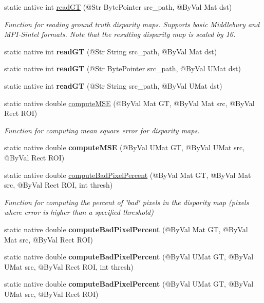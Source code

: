 \begin{DoxyCompactItemize}
static native int \hyperlink{group__ximgproc__filters_ga98c3c9fc13d0d1e808c73c8a0ae91a09}{read\+GT} (@Str Byte\+Pointer src\+\_\+path, @By\+Val Mat dst)
\begin{DoxyCompactList}\small\item\em Function for reading ground truth disparity maps. Supports basic Middlebury and M\+P\+I-\/\+Sintel formats. Note that the resulting disparity map is scaled by 16. \end{DoxyCompactList}\item 
static native int {\bfseries read\+GT} (@Str String src\+\_\+path, @By\+Val Mat dst)
\item 
static native int {\bfseries read\+GT} (@Str Byte\+Pointer src\+\_\+path, @By\+Val U\+Mat dst)
\item 
static native int {\bfseries read\+GT} (@Str String src\+\_\+path, @By\+Val U\+Mat dst)
\item 
static native double \hyperlink{group__ximgproc__filters_ga0f224e6315d538e257cba2fb7ae0bbee}{compute\+M\+SE} (@By\+Val Mat GT, @By\+Val Mat src, @By\+Val Rect R\+OI)
\begin{DoxyCompactList}\small\item\em Function for computing mean square error for disparity maps. \end{DoxyCompactList}\item 
static native double {\bfseries compute\+M\+SE} (@By\+Val U\+Mat GT, @By\+Val U\+Mat src, @By\+Val Rect R\+OI)
\item 
static native double \hyperlink{group__ximgproc__filters_ga04b04ac57f6b8c53deacbb1d41d05766}{compute\+Bad\+Pixel\+Percent} (@By\+Val Mat GT, @By\+Val Mat src, @By\+Val Rect R\+OI, int thresh)
\begin{DoxyCompactList}\small\item\em Function for computing the percent of \char`\"{}bad\char`\"{} pixels in the disparity map (pixels where error is higher than a specified threshold) \end{DoxyCompactList}\item 
static native double {\bfseries compute\+Bad\+Pixel\+Percent} (@By\+Val Mat GT, @By\+Val Mat src, @By\+Val Rect R\+OI)
\item 
static native double {\bfseries compute\+Bad\+Pixel\+Percent} (@By\+Val U\+Mat GT, @By\+Val U\+Mat src, @By\+Val Rect R\+OI, int thresh)
\item 
static native double {\bfseries compute\+Bad\+Pixel\+Percent} (@By\+Val U\+Mat GT, @By\+Val U\+Mat src, @By\+Val Rect R\+OI)

\end{DoxyCompactItemize}
